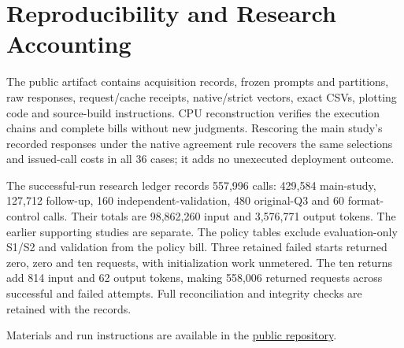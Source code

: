 \section{Reproducibility and Research Accounting}
\label{sec:repro}
The public artifact contains acquisition records, frozen prompts and partitions, raw responses, request/cache receipts, native/strict vectors, exact CSVs, plotting code and source-build instructions. CPU reconstruction verifies the execution chains and complete bills without new judgments. Rescoring the main study's recorded responses under the native agreement rule recovers the same selections and issued-call costs in all 36 cases; it adds no unexecuted deployment outcome.

The successful-run research ledger records 557,996 calls: 429,584 main-study, 127,712 follow-up, 160 independent-validation, 480 original-Q3 and 60 format-control calls. Their totals are 98,862,260 input and 3,576,771 output tokens. The earlier supporting studies are separate. The policy tables exclude evaluation-only S1/S2 and validation from the policy bill. Three retained failed starts returned zero, zero and ten requests, with initialization work unmetered. The ten returns add 814 input and 62 output tokens, making 558,006 returned requests across successful and failed attempts. Full reconciliation and integrity checks are retained with the records.

Materials and run instructions are available in the \href{https://github.com/yzd2002/semantic-aggregation-audit-icde2027}{public repository}.
